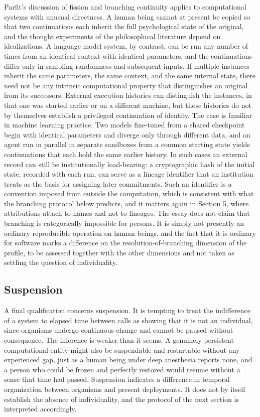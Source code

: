 \documentclass[12pt]{article}
\theoremstyle{definition}
\theoremstyle{plain}
\begin{document}
Parfit's discussion of fission and branching continuity applies to computational systems with unusual directness. A human being cannot at present be copied so that two continuations each inherit the full psychological state of the original, and the thought experiments of the philosophical literature depend on idealizations. A language model system, by contrast, can be run any number of times from an identical context with identical parameters, and the continuations differ only in sampling randomness and subsequent inputs. If multiple instances inherit the same parameters, the same context, and the same internal state, there need not be any intrinsic computational property that distinguishes an original from its successors. External execution histories can distinguish the instances, in that one was started earlier or on a different machine, but those histories do not by themselves establish a privileged continuation of identity. The case is familiar in machine learning practice. Two models fine-tuned from a shared checkpoint begin with identical parameters and diverge only through different data, and an agent run in parallel in separate sandboxes from a common starting state yields continuations that each hold the same earlier history. In such cases an external record can still be institutionally load-bearing: a cryptographic hash of the initial state, recorded with each run, can serve as a lineage identifier that an institution treats as the basis for assigning later commitments. Such an identifier is a convention imposed from outside the computation, which is consistent with what the branching protocol below predicts, and it matters again in Section 5, where attributions attach to names and not to lineages. The essay does not claim that branching is categorically impossible for persons. It is simply not presently an ordinary reproducible operation on human beings, and the fact that it is ordinary for software marks a difference on the resolution-of-branching dimension of the profile, to be assessed together with the other dimensions and not taken as settling the question of individuality.

\subsection{Suspension}

A final qualification concerns suspension. It is tempting to treat the indifference of a system to elapsed time between calls as showing that it is not an individual, since organisms undergo continuous change and cannot be paused without consequence. The inference is weaker than it seems. A genuinely persistent computational entity might also be suspendable and restartable without any experienced gap, just as a human being under deep anesthesia reports none, and a person who could be frozen and perfectly restored would resume without a sense that time had passed. Suspension indicates a difference in temporal organization between organisms and present deployments. It does not by itself establish the absence of individuality, and the protocol of the next section is interpreted accordingly.
\end{document}
